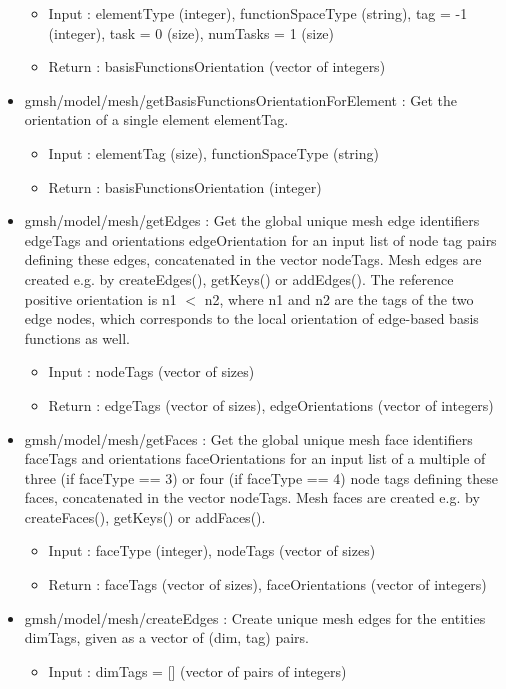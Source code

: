 \documentclass[dvipdfmx, 9pt, a4paper]{article}
\numberwithin{equation}{section}
\begin{document}
\begin{itemize}
\begin{itemize}
\item Input : elementType (integer), functionSpaceType (string), tag = -1 (integer), task = 0 (size), numTasks = 1 (size)
\item Return : basisFunctionsOrientation (vector of integers)
\end{itemize}
\item gmsh/model/mesh/getBasisFunctionsOrientationForElement : Get the orientation of a single element elementTag.
\begin{itemize}
\item Input : elementTag (size), functionSpaceType (string)
\item Return : basisFunctionsOrientation (integer)
\end{itemize}
\item gmsh/model/mesh/getEdges : Get the global unique mesh edge identifiers edgeTags and orientations edgeOrientation for an input list of node tag pairs defining these edges, concatenated in the vector nodeTags. Mesh edges are created e.g. by createEdges(), getKeys() or addEdges(). The reference positive orientation is n1 $<$ n2, where n1 and n2 are the tags of the two edge nodes, which corresponds to
the local orientation of edge-based basis functions as well.
\begin{itemize}
\item Input : nodeTags (vector of sizes)
\item Return : edgeTags (vector of sizes), edgeOrientations (vector of integers)
\end{itemize}
\item gmsh/model/mesh/getFaces : Get the global unique mesh face identifiers faceTags and orientations faceOrientations for an input list of a multiple of three (if faceType == 3) or four (if faceType == 4) node tags defining these faces, concatenated in the vector nodeTags. Mesh faces are created e.g. by createFaces(), getKeys() or addFaces().
\begin{itemize}
\item Input : faceType (integer), nodeTags (vector of sizes)
\item Return : faceTags (vector of sizes), faceOrientations (vector of integers)
\end{itemize}
\item gmsh/model/mesh/createEdges : Create unique mesh edges for the entities dimTags, given as a vector of (dim, tag) pairs.
\begin{itemize}
\item Input : dimTags = [] (vector of pairs of integers)

\end{itemize}
\end{itemize}
\end{document}
